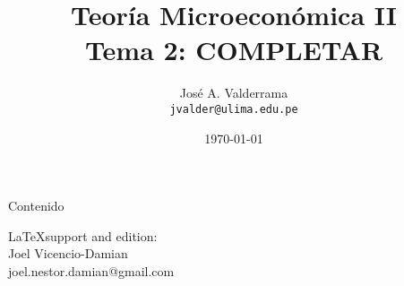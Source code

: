 \documentclass{beamer}
\title{Teoría Microeconómica II\\
		Tema 2: COMPLETAR}
\author[José A. Valderrama]{\large{José A. Valderrama}\\
		{\small \texttt{jvalder@ulima.edu.pe} {\color{black}{\faIcon{envelope}}}}}
\institute{\large Universidad de Lima - Carrera de Economía}
\date{\today}
\begin{document}
	\begin{frame}[plain]
		\maketitle
	\end{frame}
	\begin{frame}{Contenido}
		\tableofcontents
	\end{frame}

	
	
	
	

	\begin{frame}
		\maketitle
		{\small
			\LaTeX \enskip support and edition:\\
			Joel Vicencio-Damian\\
			\vspace{-0.05cm}
			joel.nestor.damian@gmail.com }
	\end{frame}

\end{document}

